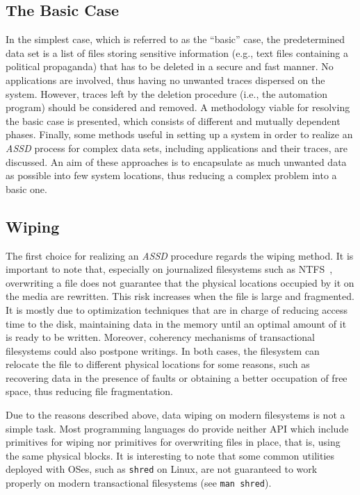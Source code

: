 \documentclass[conference]{IEEEtran}
\newcommand{\assd}{\emph{ASSD}\xspace}
\begin{document}
\subsection{The Basic Case}
\label{basic}
In the simplest case, which is referred to as the ``basic'' case, the predetermined data set is a list of files storing sensitive information (e.g., text files containing a political propaganda) that has to be deleted in a secure and fast manner. No applications are involved, thus having no unwanted traces dispersed on the system. However, traces left by the deletion procedure (i.e., the automation program) should be considered and removed.
A methodology viable for resolving the basic case is presented, which consists of different and mutually dependent phases. Finally, some methods useful in setting up a system in order to realize an \assd process for complex data sets, including applications and their traces, are discussed. An aim of these approaches is to encapsulate as much unwanted data as possible into few system locations, thus reducing a complex problem into a basic one.


\subsection{Wiping}
\label{ramethod}
The first choice for realizing an \assd procedure regards the wiping method.
It is important to note that, especially on journalized filesystems such as NTFS~\cite{ntfs}, overwriting a file does not guarantee that the physical locations occupied by it on the media are rewritten. This risk increases when the file is large and fragmented.
It is mostly due to optimization techniques that are in charge of reducing access time to the disk, maintaining data in the memory until an optimal amount of it is ready to be written. Moreover, coherency mechanisms of transactional filesystems could also postpone writings.
In both cases, the filesystem can relocate the file to different physical locations for some reasons, such as recovering data in the presence of faults or obtaining a better occupation of free space, thus reducing file fragmentation.

Due to the reasons described above, data wiping on modern filesystems is not a simple task. Most programming languages do provide neither API which include primitives for wiping nor primitives for overwriting files in place, that is, using the same physical blocks. It is interesting to note that some common utilities deployed with OSes, such as \verb=shred= on Linux, are not guaranteed to work properly on modern transactional filesystems (see \verb=man shred=).
\end{document}
